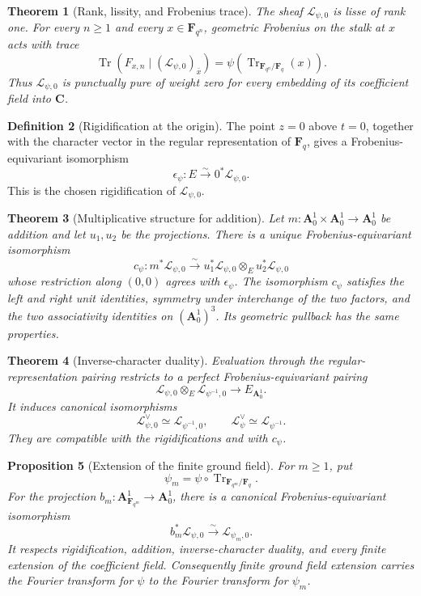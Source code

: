 \documentclass[10pt]{article}
\newtheorem{theorem}{Theorem}[section]
\newtheorem{proposition}[theorem]{Proposition}
\theoremstyle{definition}
\newtheorem{definition}[theorem]{Definition}
\newcommand{\Fq}{\mathbf F_q}
\newcommand{\Aone}{\mathbf A^1}
\newcommand{\Tr}{\operatorname{Tr}}
\begin{document}
\begin{theorem}[Rank, lissity, and Frobenius trace]
The sheaf \(\mathcal L_{\psi,0}\) is lisse of rank one.  For every
\(n\ge1\) and every \(x\in\mathbf F_{q^n}\), geometric Frobenius on the
stalk at \(x\) acts with trace
\[
 \Tr\!\left(F_{x,n}\mid(\mathcal L_{\psi,0})_{\bar x}\right)
 =\psi\!\left(\Tr_{\mathbf F_{q^n}/\Fq}(x)\right).
\]
Thus \(\mathcal L_{\psi,0}\) is punctually pure of weight zero for every
embedding of its coefficient field into \(\mathbf C\).
\end{theorem}

\begin{definition}[Rigidification at the origin]
The point \(z=0\) above \(t=0\), together with the character vector in the
regular representation of \(\Fq\), gives a Frobenius-equivariant
isomorphism
\[
 \epsilon_\psi:E\xrightarrow{\sim}0^*\mathcal L_{\psi,0}.
\]
This is the chosen rigidification of \(\mathcal L_{\psi,0}\).
\end{definition}

\begin{theorem}[Multiplicative structure for addition]
Let \(m:\Aone_0\times\Aone_0\to\Aone_0\) be addition and let
\(u_1,u_2\) be the projections.  There is a unique
Frobenius-equivariant isomorphism
\[
 c_\psi:m^*\mathcal L_{\psi,0}
 \xrightarrow{\sim}
 u_1^*\mathcal L_{\psi,0}\otimes_Eu_2^*\mathcal L_{\psi,0}
\]
whose restriction along \((0,0)\) agrees with \(\epsilon_\psi\).  The
isomorphism \(c_\psi\) satisfies the left and right unit identities,
symmetry under interchange of the two factors, and the two associativity
identities on \((\Aone_0)^3\).  Its geometric pullback has the same
properties.
\end{theorem}

\begin{theorem}[Inverse-character duality]
Evaluation through the regular-representation pairing restricts to a
perfect Frobenius-equivariant pairing
\[
 \mathcal L_{\psi,0}\otimes_E\mathcal L_{\psi^{-1},0}
 \longrightarrow E_{\Aone_0}.
\]
It induces canonical isomorphisms
\[
 \mathcal L_{\psi,0}^{\vee}\simeq\mathcal L_{\psi^{-1},0},
 \qquad
 \mathcal L_\psi^{\vee}\simeq\mathcal L_{\psi^{-1}}.
\]
They are compatible with the rigidifications and with \(c_\psi\).
\end{theorem}

\begin{proposition}[Extension of the finite ground field]
For \(m\ge1\), put
\[
 \psi_m=\psi\circ\Tr_{\mathbf F_{q^m}/\Fq}.
\]
For the projection \(b_m:\Aone_{\mathbf F_{q^m}}\to\Aone_0\), there is a
canonical Frobenius-equivariant isomorphism
\[
 b_m^*\mathcal L_{\psi,0}\xrightarrow{\sim}\mathcal L_{\psi_m,0}.
\]
It respects rigidification, addition, inverse-character duality, and every
finite extension of the coefficient field.  Consequently finite ground
field extension carries the Fourier transform for \(\psi\) to the Fourier
transform for \(\psi_m\).
\end{proposition}
\end{document}
